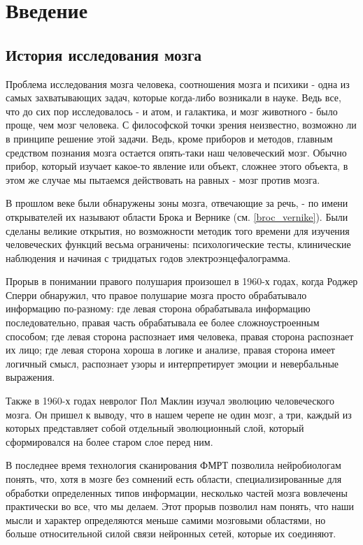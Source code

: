 \documentclass[pdftex,ptm,12pt,a4paper]{report}
\theoremstyle{definition}
\begin{document}
\tableofcontents
\sloppy

\parindent=1.25cm

\chapter{Введение}
\section{История исследования мозга}

Проблема исследования мозга человека, соотношения мозга и психики - одна из самых захватывающих задач, которые когда-либо возникали в науке. Ведь все, что до сих пор исследовалось - и атом, и галактика, и мозг животного - было проще, чем мозг человека. С философской точки зрения неизвестно, возможно ли в принципе решение этой задачи. Ведь, кроме приборов и методов, главным средством познания мозга остается опять-таки наш человеческий мозг. Обычно прибор, который изучает какое-то явление или объект, сложнее этого объекта, в этом же случае мы пытаемся действовать на равных - мозг против мозга.

В прошлом веке были обнаружены зоны мозга, отвечающие за речь, - по имени открывателей их называют области Брока и Вернике (см. \ref{broc_vernike}). Были сделаны великие открытия, но возможности методик того времени для изучения человеческих функций весьма ограничены: психологические тесты, клинические наблюдения и начиная с тридцатых годов электроэнцефалограмма.

Прорыв в понимании правого полушария произошел в 1960-х годах, когда Роджер Сперри обнаружил, что правое полушарие мозга просто обрабатывало информацию по-разному: где левая сторона обрабатывала информацию последовательно, правая часть обрабатывала ее более сложноустроенным способом; где левая сторона распознает имя человека, правая сторона распознает их лицо; где левая сторона хороша в логике и анализе, правая сторона имеет логичный смысл, распознает узоры и интерпретирует эмоции и невербальные выражения.

Также в 1960-х годах невролог Пол Маклин изучал эволюцию человеческого мозга. Он пришел к выводу, что в нашем черепе не один мозг, а три, каждый из которых представляет собой отдельный эволюционный слой, который сформировался на более старом слое перед ним.

В последнее время технология сканирования ФМРТ позволила нейробиологам понять, что, хотя в мозге без сомнений есть области, специализированные для обработки определенных типов информации, несколько частей мозга вовлечены практически во все, что мы делаем. Этот прорыв позволил нам понять, что наши мысли и характер определяются меньше самими мозговыми областями, но больше относительной силой связи нейронных сетей, которые их соединяют.
\end{document}
